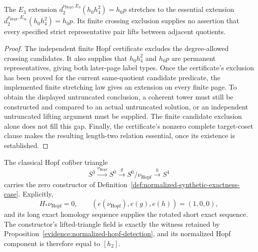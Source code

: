 \begin{proposition}
  \label{prop:page-stretch-regression}
  \notready
  The $E_3$ extension
  $d_2^{\nu_{\mathrm{Hopf}},E_3}(h_0h_4^2)=h_0p$ stretches to the
  essential extension
  $d_2^{\nu_{\mathrm{Hopf}},E_\infty}(h_0h_4^2)=h_0p$.
  Its finite crossing exclusion supplies no assertion that every specified
  strict representative pair lifts between adjacent quotients.
\end{proposition}

\begin{proof}
  The independent finite Hopf certificate excludes the degree-allowed
  crossing candidates.  It also supplies that $h_0h_4^2$ and $h_0p$ are
  permanent representatives, giving both later-page label types.
  Once the certificate's exclusion has been proved for the current
  same-quotient candidate predicate, the implemented finite stretching
  law gives an extension on every finite page.  To obtain the displayed untruncated conclusion,
  a coherent tower must still be constructed and compared to an actual
  untruncated solution, or an independent untruncated lifting argument
  must be supplied.  The finite candidate exclusion alone does not fill
  this gap.  Finally, the certificate's nonzero complete target-coset
  clause makes the resulting length-two relation essential, once its
  existence is established.
\end{proof}

\begin{lemma}
  \label{lem:normalized-hopf-exactness-case}
  \notready
  The classical Hopf cofiber triangle
  \[
    S^3\xrightarrow{\nu_{\mathrm{Hopf}}}S^0\xrightarrow g
    S^0/\nu_{\mathrm{Hopf}}\xrightarrow hS^4
  \]
  carries the zero constructor of
  Definition~\ref{def:normalized-synthetic-exactness-case}.  Explicitly,
  \[
    H_*\nu_{\mathrm{Hopf}}=0,
    \qquad
    (e(\nu_{\mathrm{Hopf}}),e(g),e(h))=(1,0,0),
  \]
  and its long exact homology sequence supplies the rotated short exact
  sequence.  The constructor's lifted-triangle field is exactly the witness
  retained by Proposition~\ref{evidence:normalized-hopf-detection}, and its
  normalized Hopf component is therefore equal to $[h_2]$.
\end{lemma}

